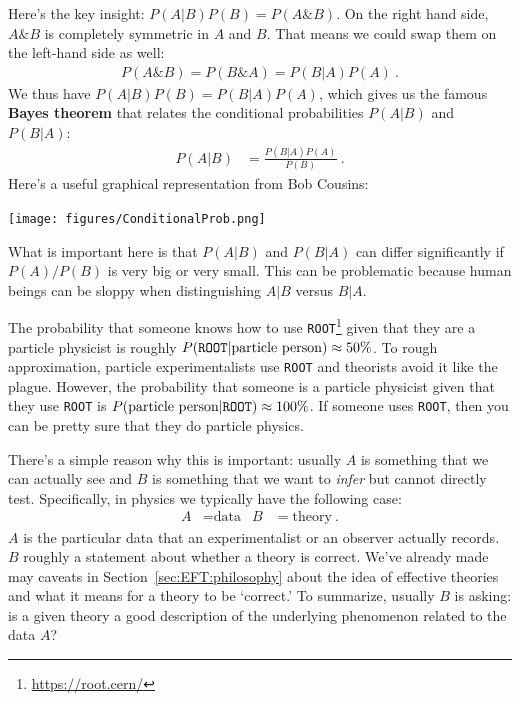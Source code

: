 Here's the key insight: $P(A|B)P(B) = P(A\& B)$. On the right hand side, $A\&B$ is completely symmetric in $A$ and $B$. That means we could swap them on the left-hand side as well: 
\begin{align}
	P(A\&B) = P(B\& A) = P(B|A)P(A) \ . 
\end{align}
We thus have $P(A|B)P(B)=P(B|A)P(A)$, which gives us the famous \textbf{Bayes theorem} that relates the conditional probabilities $P(A|B)$ and $P(B|A)$:
\begin{align}
	P(A|B) &= \frac{P(B|A) P(A)}{P(B)} \ .
\end{align}
Here's a useful graphical representation from Bob Cousins:
\begin{center}
\texttt{[image: figures/ConditionalProb.png]}
\end{center}
What is important here is that $P(A|B)$ and $P(B|A)$ can differ significantly if $P(A)/P(B)$ is very big or very small. This can be problematic because human beings can be sloppy when distinguishing $A|B$ versus $B|A$. 
\begin{example}
The probability that someone knows how to use \texttt{ROOT}\footnote{\url{https://root.cern/}} given that they are a particle physicist is roughly $P(\text{\texttt{ROOT}}|\text{particle person}) \approx 50\%$. To rough approximation, particle experimentalists use \texttt{ROOT} and theorists avoid it like the plague. However, the probability that someone is a particle physicist given that they use \texttt{ROOT} is $P(\text{particle person}|\text{\texttt{ROOT}}) \approx 100\%$. If someone uses \texttt{ROOT}, then you can be pretty sure that they do particle physics.
\end{example}

There's a simple reason why this is important: usually $A$ is something that we can actually see and $B$ is something that we want to \emph{infer} but cannot directly test. Specifically, in physics we typically have the following case:
\begin{align}
	A &= \text{data} 
	&
	B &= \text{theory} \ .
\end{align}
$A$ is the particular data that an experimentalist or an observer actually records. $B$ roughly a statement about whether a theory is correct. 
% 
We've already made may caveats in Section~\ref{sec:EFT:philosophy} about the idea of effective theories and what it means for a theory to be `correct.' To summarize, usually $B$ is asking: is a given theory a good description of the underlying phenomenon related to the data $A$? 

